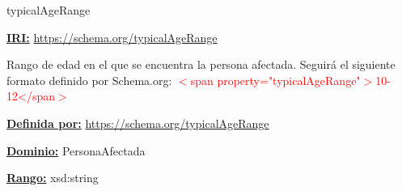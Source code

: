 \begin{mybox}{typicalAgeRange}
\begin{flushleft}
\underline{\textbf{IRI:}}
\url{https://schema.org/typicalAgeRange}
\newline

Rango de edad en el que se encuentra la persona afectada.
\newline Seguirá el siguiente formato definido por Schema.org: 
\newline  \textcolor{red}{ $<$span property="typicalAgeRange"$>$10-12</span$>$ } \cite{schema_typicalAgeRange}
\newline

\underline{\textbf{Definida por:}}
\url{https://schema.org/typicalAgeRange}
\newline

\underline{\textbf{Dominio:}} 
\newline PersonaAfectada
\newline

\underline{\textbf{Rango:}}
\newline xsd:string
\newline

\end{flushleft}
\end{mybox}








